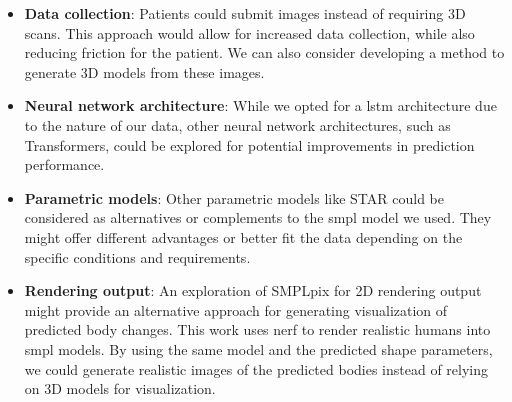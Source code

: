 \begin{itemize}
      \item \textbf{Data collection}: Patients could submit images instead of
            requiring 3D scans. This approach would allow for increased data collection,
            while also reducing friction for the patient. We can also consider
            developing a method to generate 3D models from these images.

      \item \textbf{Neural network architecture}: While we opted for a \gls{lstm}
            architecture due to the nature of our data, other neural network architectures,
            such as Transformers, could be explored for potential improvements in
            prediction performance.

      \item \textbf{Parametric models}: Other parametric models like STAR could
            be considered as alternatives or complements to the \gls{smpl}
            model we used. They might offer different advantages or better fit
            the data depending on the specific conditions and requirements.

      \item \textbf{Rendering output}: An exploration of SMPLpix \citep{prokudin2021smplpix} for 2D
            rendering output might provide an alternative approach for generating
            visualization of predicted body changes. This work uses \gls{nerf} to render
            realistic humans into \gls{smpl} models. By using the same model and the predicted
            shape parameters, we could generate realistic images of the predicted bodies instead
            of relying on 3D models for visualization.
\end{itemize}